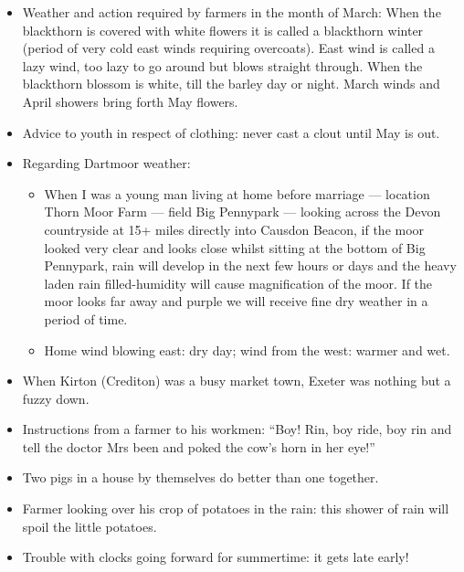 
\begin{itemize}
  \item Weather and action required by farmers in the month of March:
When the blackthorn is covered with white flowers it is called a blackthorn winter (period of very cold east winds requiring overcoats).  East wind is called a lazy wind, too lazy to go around but blows straight through.
When the blackthorn blossom is white, till the barley day or night.
March winds and April showers bring forth May flowers.

  \item Advice to youth in respect of clothing: never cast a clout until May is out.

  \item Regarding Dartmoor weather:
  \begin{itemize}
    \item When I was a young man living at home before marriage — location Thorn Moor Farm — field Big Pennypark — looking across the Devon countryside at 15+ miles directly into Causdon Beacon, if the moor looked very clear and looks close whilst sitting at the bottom of Big Pennypark, rain will develop in the next few hours or days and the heavy laden rain filled-humidity will cause magnification of the moor. If the moor looks far away and purple we will receive fine dry weather in a period of time.
    \item Home wind blowing east: dry day; wind from the west: warmer and wet.
  \end{itemize}

  \item When Kirton (Crediton) was a busy market town, Exeter was nothing but a fuzzy down.

  \item Instructions from a farmer to his workmen: ``Boy! Rin, boy ride, boy rin and tell the doctor Mrs been and poked the cow’s horn in her eye!''

  \item Two pigs in a house by themselves do better than one together.

  \item Farmer looking over his crop of potatoes in the rain: this shower of rain will spoil the little potatoes.

  \item Trouble with clocks going forward for summertime: it gets late early!
\end{itemize}